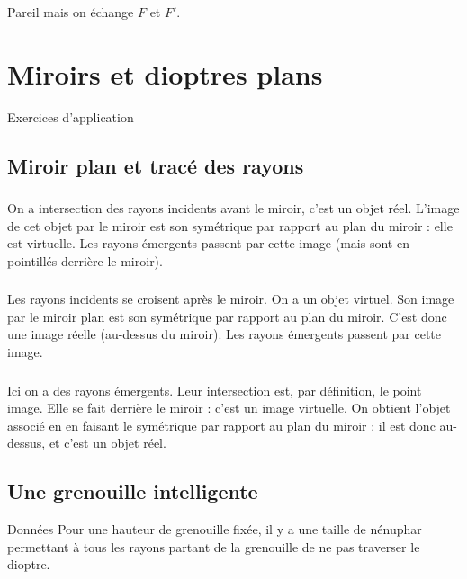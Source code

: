 \documentclass[10pt,a5paper,notitlepage]{book}
\begin{document}
\subsection{}
Pareil mais on échange $F$ et $F'$.

\theendnotes

\chapter{Miroirs et dioptres plans}
\vspace*{-47pt}
\begin{center}
    \Huge Exercices d'application
\end{center}

\section{Miroir plan et tracé des rayons}
\subsection{}
On a intersection des rayons incidents avant le miroir, c'est un objet réel.
L'image de cet objet par le miroir est son symétrique par rapport au plan du
miroir : elle est virtuelle. Les rayons émergents passent par cette image (mais
sont en pointillés derrière le miroir).

\subsection{}
Les rayons incidents se croisent après le miroir. On a un objet virtuel. Son
image par le miroir plan est son symétrique par rapport au plan du miroir. C'est
donc une image réelle (au-dessus du miroir). Les rayons émergents passent par
cette image.

\subsection{}
Ici on a des rayons émergents. Leur intersection est, par définition, le point
image. Elle se fait derrière le miroir : c'est un image virtuelle. On obtient
l'objet associé en en faisant le symétrique par rapport au plan du miroir : il
est donc au-dessus, et c'est un objet réel.

\section{Une grenouille intelligente}
\begin{NCdefi}{Données}
    Pour une hauteur de grenouille fixée, il y a une taille de
    nénuphar permettant à tous les rayons partant de la grenouille de ne
    pas traverser le dioptre.
\end{NCdefi}
\end{document}
